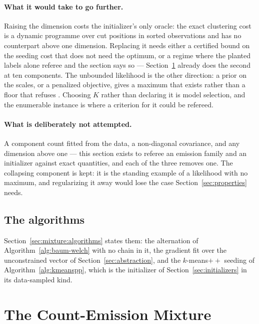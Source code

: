 \documentclass[11pt,a4paper]{article}
\begin{document}
\paragraph{What it would take to go further.}
Raising the dimension costs the initializer's only oracle: the exact clustering
cost is a dynamic programme over cut positions in sorted observations and has
no counterpart above one dimension. Replacing it needs either a certified bound
on the seeding cost that does not need the optimum, or a regime where the
planted labels alone referee and the section says so ---
Section~\ref{sec:emissionmixture} already does the second at ten components.
The unbounded likelihood is the other direction: a prior on the scales, or a
penalized objective, gives a maximum that exists rather than a floor that
refuses \citep{bishop2006, murphy2023}. Choosing $K$ rather than declaring it
is model selection, and the enumerable instance is where a criterion for it
could be refereed.

\paragraph{What is deliberately not attempted.}
A component count fitted from the data, a non-diagonal covariance, and any
dimension above one --- this section exists to referee an emission family and
an initializer against exact quantities, and each of the three removes one. The
collapsing component is kept: it is the standing example of a likelihood with
no maximum, and regularizing it away would lose the case
Section~\ref{sec:properties} needs.

\subsection{The algorithms}
Section~\ref{sec:mixture:algorithms} states them: the
alternation of Algorithm~\ref{alg:baum-welch} with no chain in it, the
gradient fit over the unconstrained vector of Section~\ref{sec:abstraction},
and the $k$-means$++$ seeding of Algorithm~\ref{alg:kmeanspp}, which is the
initializer of Section~\ref{sec:initializers} in its data-sampled kind.

\section{The Count-Emission Mixture}
\label{sec:emissionmixture}
\end{document}
